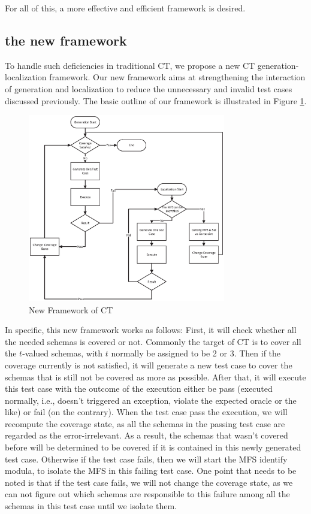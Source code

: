\documentclass{sig-alternate}
\begin{document}
For all of this, a more effective and efficient framework is desired.

\subsection{the new framework}
To handle such deficiencies in traditional CT, we propose a new CT generation-localization framework. Our new framework aims at strengthening the interaction of generation and localization to reduce the unnecessary and invalid test cases discussed previously. The basic outline of our framework is illustrated in Figure \ref{new-life}.
\begin{figure}
 \includegraphics[width=3.4in]{baicOutline.eps}
\caption{New Framework of CT}
\label{new-life}
\end{figure}

In specific, this new framework works as follows: First, it will check whether all the needed schemas is covered or not. Commonly the target of CT is to cover all the $t$-valued schemas, with $t$ normally be assigned to be 2 or 3. Then if the coverage currently is not satisfied, it will generate a new test case to cover the schemas that is still not be covered as more as possible. After that, it will execute this test case with the outcome of the execution either be pass (executed normally, i.e., doesn't triggered an exception, violate the expected oracle or the like) or fail (on the contrary). When the test case pass the execution, we will recompute the coverage state, as all the schemas in the passing test case are regarded as the error-irrelevant. As a result, the schemas that wasn't covered before will be determined to be covered if it is contained in this newly generated test case. Otherwise if the test case fails, then we will start the MFS identify modula, to isolate the MFS in this failing test case. One point that needs to be noted is that if the test case fails, we will not change the coverage state, as we can not figure out which schemas are responsible to this failure among all the schemas in this test case until we isolate them.
\end{document}
